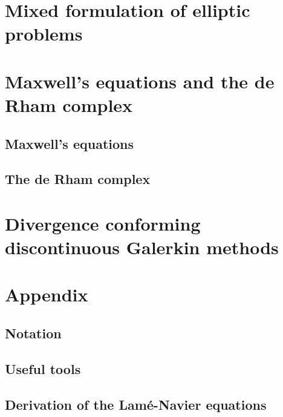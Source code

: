 \chapter{Mixed formulation of elliptic problems}
\label{cha:darcy}


\chapter{Maxwell's equations and the de Rham complex}
\section{Maxwell's equations}
\label{cha:maxwell}


\section{The de Rham complex}
\label{cha:derham}


\chapter{Divergence conforming discontinuous Galerkin methods}
\label{cha:hdivdg}


% 
% 

\appendix
\chapter{Appendix}
\section{Notation}



\section{Useful tools}


\section{Derivation of the Lamé-Navier equations}
\label{sec:lame-navier}




\printindex


